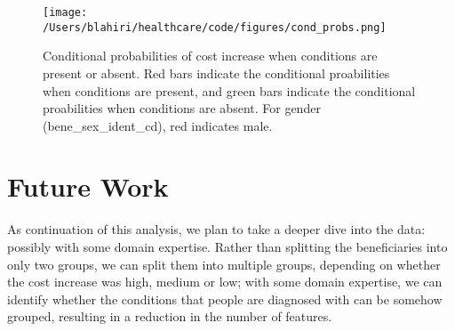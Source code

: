 \begin{figure*}[!h]
    \centering
    \texttt{[image: /Users/blahiri/healthcare/code/figures/cond\_probs.png]}
    \caption{\small Conditional probabilities of cost increase when conditions are present or absent. Red bars indicate the conditional proabilities when conditions are present, and green bars indicate the conditional proabilities when conditions are absent. For gender (bene\_sex\_ident\_cd), red indicates male.}
    \label{fig:cond_probs}
\end{figure*}

\section{Future Work}
\label{sec:future}
As continuation of this analysis, we plan to take a deeper dive into the data: possibly with some domain expertise. Rather than splitting the beneficiaries into only two groups, we can split them into multiple groups, depending on whether the cost increase was high, medium or low; with some domain expertise, we can identify whether the conditions that people are diagnosed with can be somehow grouped, resulting in a reduction in the number of features.   
